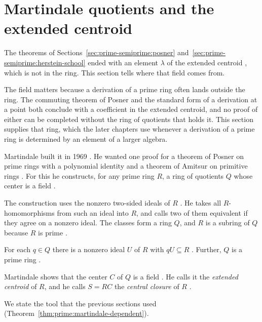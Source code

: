 \section{Martindale quotients and the extended centroid}\label{sec:prime-semiprime:quotient-rings}

The theorems of Sections~\ref{sec:prime-semiprime:posner}
and~\ref{sec:prime-semiprime:herstein-school} ended with an element $\lambda$
of the extended centroid \cite[p.~577]{Martindale1969}, which is not in the ring.
This section tells where that field comes from.

The field matters because a derivation of a prime ring often lands outside the
ring. The commuting theorem of Posner and the standard form of a derivation at
a point both conclude with a coefficient in the extended centroid, and no proof
of either can be completed without the ring of quotients that holds it. This
section supplies that ring, which the later chapters use whenever a derivation
of a prime ring is determined by an element of a larger algebra.

Martindale built it in 1969 \cite{Martindale1969}. He wanted one proof for a theorem of Posner on prime
rings with a polynomial identity and a theorem of Amitsur on primitive rings
\cite[p.~576]{Martindale1969}. For this he constructs, for any prime ring $R$, a
ring of quotients $Q$ whose center is a field \cite[p.~576]{Martindale1969}.

The construction uses the nonzero two-sided ideals of $R$
\cite[p.~576]{Martindale1969}. He takes all $R$-homomorphisms from such an ideal
into $R$, and calls two of them equivalent if they agree on a nonzero ideal. The
classes form a ring $Q$, and $R$ is a subring of $Q$ because $R$ is prime
\cite[p.~577]{Martindale1969}.

For each $q\in Q$ there is a nonzero ideal $U$ of $R$ with $qU\subseteq R$
\cite[p.~577]{Martindale1969}. Further, $Q$ is a prime ring
\cite[p.~577]{Martindale1969}.

Martindale shows that the center $C$ of $Q$ is a field
\cite[p.~577]{Martindale1969}. He calls it the \emph{extended centroid} of
$R$, and he calls $S=RC$ the \emph{central closure} of $R$
\cite[p.~577]{Martindale1969}.

We state the tool that the previous sections used (Theorem~\ref{thm:prime:martindale-dependent}).

